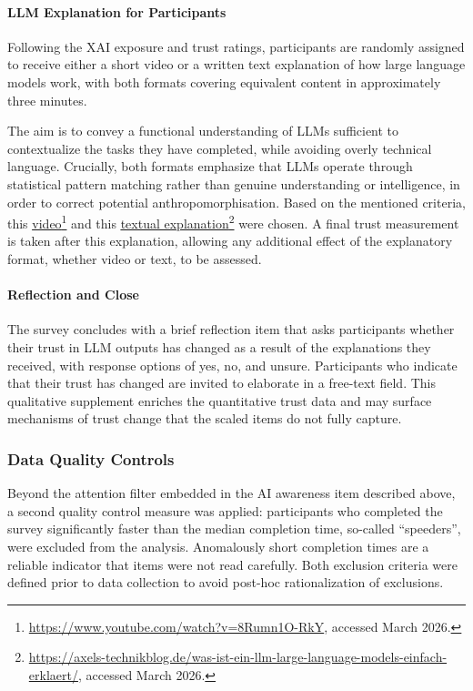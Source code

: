 \paragraph{LLM Explanation for Participants}
\label{sec:llm_explanations}

Following the XAI exposure and trust ratings, participants are randomly assigned to receive either a short video or a written text explanation of how large language models work, with both formats covering equivalent content in approximately three minutes. 

The aim is to convey a functional understanding of LLMs sufficient to contextualize the tasks they have completed, while avoiding overly technical language. Crucially, both formats emphasize that LLMs operate through statistical pattern matching rather than genuine understanding or intelligence, in order to correct potential anthropomorphisation. Based on the mentioned criteria, this \href{https://www.youtube.com/watch?v=8Rumn1O-RkY}{\underline{video}}\footnote{\url{https://www.youtube.com/watch?v=8Rumn1O-RkY}, accessed March 2026.} and this \href{https://axels-technikblog.de/was-ist-ein-llm-large-language-models-einfach-erklaert/}{\underline{textual explanation}}\footnote{\url{https://axels-technikblog.de/was-ist-ein-llm-large-language-models-einfach-erklaert/}, accessed March 2026.} were chosen.
A final trust measurement is taken after this explanation, allowing any additional effect of the explanatory format, whether video or text, to be assessed.

\paragraph{Reflection and Close}
\label{sec:reflection_and_close}

The survey concludes with a brief reflection item that asks participants whether their trust in LLM outputs has changed as a result of the explanations they received, with response options of yes, no, and unsure. Participants who indicate that their trust has changed are invited to elaborate in a free-text field. This qualitative supplement enriches the quantitative trust data and may surface mechanisms of trust change that the scaled items do not fully capture.

\subsubsection{Data Quality Controls}

Beyond the attention filter embedded in the AI awareness item described above, a second quality control measure was applied: participants who completed the survey significantly faster than the median completion time, so-called ``speeders'', were excluded from the analysis. Anomalously short completion times are a reliable indicator that items were not read carefully. Both exclusion criteria were defined prior to data collection to avoid post-hoc rationalization of exclusions.

